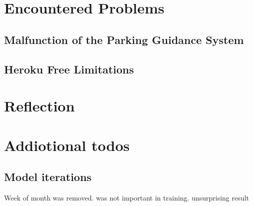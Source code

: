 \documentclass[journal,10pt]{IEEEtran}
\begin{document}
\section{Encountered Problems}\label{sec:challenges}
\subsection{Malfunction of the Parking Guidance System}


\subsection{Heroku Free Limitations}




\section{Reflection}


\section{Addiotional todos}
\subsection{Model iterations}

Week of month was removed. was not important in training. unsurprising result
  

\end{document}
